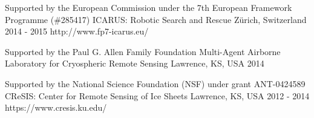 \begin{cventries}
  \cvprojentry
    {Supported by the European Commission under the 7th European Framework Programme (\#285417)} %
    {ICARUS: Robotic Search and Rescue} %
    {Z\"{u}rich, Switzerland} %
    {2014 - 2015} %
    {} %
    {} %
    {http://www.fp7-icarus.eu/}
    
  \cvprojentry
    {Supported by the Paul G. Allen Family Foundation} %
    {Multi-Agent Airborne Laboratory for Cryospheric Remote Sensing} %
    {Lawrence, KS, USA} %
    {2014} %
    {} %
    {} %
    {}
    
  \cvprojentry
    {Supported by the National Science Foundation (NSF) under grant ANT-0424589} %
    {CReSIS: Center for Remote Sensing of Ice Sheets} %
    {Lawrence, KS, USA} %
    {2012 - 2014} %
    {} %
    {} %
    {https://www.cresis.ku.edu/}


\end{cventries}
